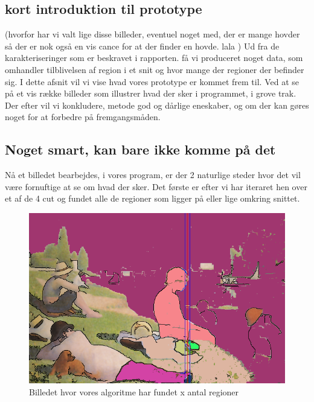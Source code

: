 \subsection{kort introduktion til prototype}
(hvorfor har vi valt lige disse billeder, eventuel noget med, der er mange hovder så der er nok også en vis cance for at der finder en hovde. lala
)
Ud fra de karakteriseringer som er beskravet i rapporten. få vi
produceret noget data, som omhandler tilblivelsen af region i et snit og
hvor mange der regioner der befinder sig. I dette afsnit vil vi vise
hvad vores prototype er kommet frem til. Ved at se på et vis række billeder
som illustrer hvad der sker i programmet, i grove trak. Der efter vil vi
konkludere, metode god og dårlige eneskaber, og om der kan gøres noget for at
forbedre på fremgangsmåden.


\subsection{Noget smart, kan bare ikke komme på det}
Nå et billedet bearbejdes, i vores program, er der 2 naturlige steder
hvor det vil være fornuftige at se om hvad der sker. Det første er efter vi har
iteraret hen over et af de 4 cut og fundet alle de regioner som ligger
på eller lige omkring snittet.

\begin{figure}[h!!]
	\begin{center}
		\includegraphics[scale=0.42,angle=0]{afsnit/afprovning/billeder/floodfillbilledet.png}
	\end{center}
	\caption[]{Billedet hvor vores algoritme har fundet x antal regioner}
	\label{ff}
\end{figure}

